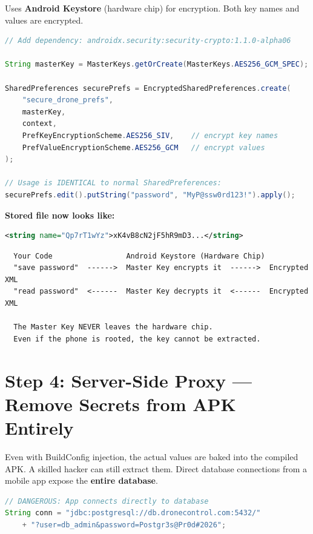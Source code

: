 \documentclass[11pt,a4paper]{article}
\newcommand{\tech}[1]{\textcolor{accent}{\textbf{#1}}}
\begin{document}
\begin{solutionbox}
Uses \tech{Android Keystore} (hardware chip) for encryption. Both key names and values are encrypted.

\begin{lstlisting}[language=Java]
// Add dependency: androidx.security:security-crypto:1.1.0-alpha06

String masterKey = MasterKeys.getOrCreate(MasterKeys.AES256_GCM_SPEC);

SharedPreferences securePrefs = EncryptedSharedPreferences.create(
    "secure_drone_prefs",
    masterKey,
    context,
    PrefKeyEncryptionScheme.AES256_SIV,    // encrypt key names
    PrefValueEncryptionScheme.AES256_GCM   // encrypt values
);

// Usage is IDENTICAL to normal SharedPreferences:
securePrefs.edit().putString("password", "MyP@ssw0rd123!").apply();
\end{lstlisting}

\textbf{Stored file now looks like:}
\begin{lstlisting}[language=XML]
<string name="Qp7rT1wYz">xK4vB8cN2jF5hR9mD3...</string>
\end{lstlisting}
\end{solutionbox}

\begin{diagrambox}
\begin{verbatim}
  Your Code                 Android Keystore (Hardware Chip)
  "save password"  ------>  Master Key encrypts it  ------>  Encrypted XML
  "read password"  <------  Master Key decrypts it  <------  Encrypted XML

  The Master Key NEVER leaves the hardware chip.
  Even if the phone is rooted, the key cannot be extracted.
\end{verbatim}
\end{diagrambox}

\section{Step 4: Server-Side Proxy --- Remove Secrets from APK Entirely}

\begin{problembox}
Even with BuildConfig injection, the actual values are baked into the compiled APK. A skilled hacker can still extract them. Direct database connections from a mobile app expose the \textbf{entire database}.
\begin{lstlisting}[language=Java]
// DANGEROUS: App connects directly to database
String conn = "jdbc:postgresql://db.dronecontrol.com:5432/"
    + "?user=db_admin&password=Postgr3s@Pr0d#2026";
\end{lstlisting}
\end{problembox}
\end{document}

